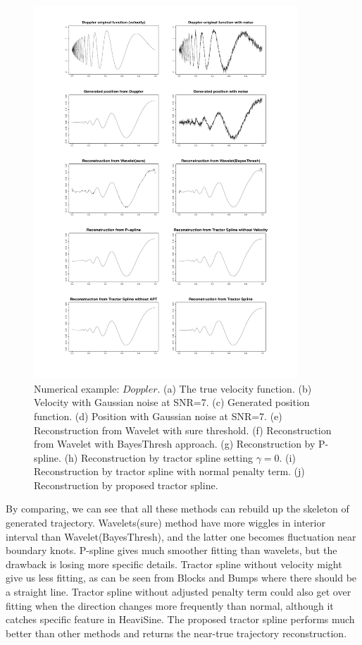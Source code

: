 \begin{figure}
  \centering
         \includegraphics[width=\textwidth,height=14cm]{Chapters/2.TractorSplineTheory/plot/doppler10} 
  \caption{Numerical example: $\textit{Doppler}$. (a) The true velocity function. (b) Velocity with Gaussian noise at SNR=7. (c) Generated position function. (d) Position with Gaussian noise at SNR=7. (e) Reconstruction from Wavelet with sure threshold. (f) Reconstruction from Wavelet with BayesThresh approach. (g) Reconstruction by P-spline. (h) Reconstruction by tractor spline setting $\gamma=0$. (i) Reconstruction by tractor spline with normal penalty term. (j) Reconstruction by proposed tractor spline.}\label{num4}
\end{figure}


By comparing, we can see that all these methods can rebuild up the skeleton of generated trajectory. Wavelets(sure) method have more wiggles in interior interval than Wavelet(BayesThresh), and the latter one becomes fluctuation near boundary knots. P-spline gives much smoother fitting than wavelets, but the drawback is losing more specific details. Tractor spline without velocity might give us less fitting, as can be seen from Blocks and Bumps where there should be a straight line. Tractor spline without adjusted penalty term could also get over fitting when the direction changes more frequently than normal, although it catches specific feature in HeaviSine. The proposed tractor spline performs much better than other methods and returns the near-true trajectory reconstruction.  

